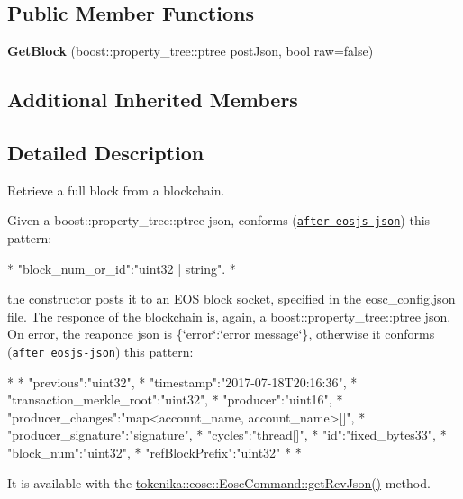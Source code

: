 \subsection*{Public Member Functions}
\begin{DoxyCompactItemize}
\item 
\mbox{\label{classtokenika_1_1eosc_1_1_get_block_a67c1536e676f26b9e9dac915092f9627}} 
{\bfseries Get\+Block} (boost\+::property\+\_\+tree\+::ptree post\+Json, bool raw=false)
\end{DoxyCompactItemize}
\subsection*{Additional Inherited Members}


\subsection{Detailed Description}
Retrieve a full block from a blockchain. 

Given a {\ttfamily boost\+::property\+\_\+tree\+::ptree json}, conforms (\href{#https://github.com/EOSIO/eosjs-json/blob/master/api/v1/chain.json}{\tt after eosjs-\/json}) this pattern\+: \begin{DoxyVerb}* {"block_num_or_id":"uint32 | string"}.
* \end{DoxyVerb}


the constructor posts it to an E\+OS block socket, specified in the {\ttfamily eosc\+\_\+config.\+json} file. The responce of the blockchain is, again, a {\ttfamily boost\+::property\+\_\+tree\+::ptree json}. On error, the reaponce json is {\ttfamily \{\char`\"{}error\char`\"{}\+:\char`\"{}error message\char`\"{}\}}, otherwise it conforms (\href{#https://github.com/EOSIO/eosjs-json/blob/master/api/v1/chain.json}{\tt after eosjs-\/json}) this pattern\+: \begin{DoxyVerb}* {
* "previous":"uint32",
* "timestamp":"2017-07-18T20:16:36",
* "transaction_merkle_root":"uint32",
* "producer":"uint16",
* "producer_changes":"map<account_name, account_name>[]",
* "producer_signature":"signature",
* "cycles":"thread[]",
* "id":"fixed_bytes33",
* "block_num":"uint32",
* "refBlockPrefix":"uint32"
* }
* \end{DoxyVerb}


It is available with the \hyperlink{classtokenika_1_1eosc_1_1_eosc_command_a2b451aefc95258d481cff16747fa1888}{tokenika\+::eosc\+::\+Eosc\+Command\+::get\+Rcv\+Json()} method.

